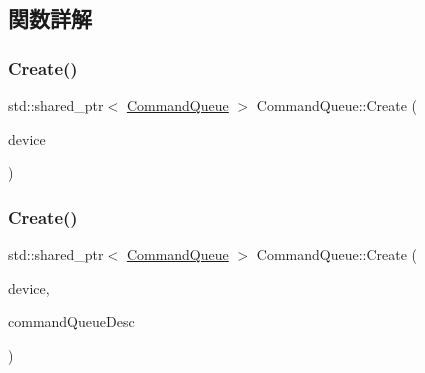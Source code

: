 \subsection{関数詳解}
\mbox{\label{class_command_queue_ad8d289f42aa38adfb872d956e678363b}} 
\subsubsection{\texorpdfstring{Create()}{Create()}\hspace{0.1cm}{\footnotesize\ttfamily [1/2]}}
{\footnotesize\ttfamily std\+::shared\+\_\+ptr$<$ \mbox{\hyperlink{class_command_queue}{Command\+Queue}} $>$ Command\+Queue\+::\+Create (\begin{DoxyParamCaption}\item[{std\+::shared\+\_\+ptr$<$ \mbox{\hyperlink{class_device}{Device}} $>$}]{device }\end{DoxyParamCaption})\hspace{0.3cm}{\ttfamily [static]}}

\mbox{\label{class_command_queue_a0498f9a8f823972c11de356a5cdd09cf}} 
\subsubsection{\texorpdfstring{Create()}{Create()}\hspace{0.1cm}{\footnotesize\ttfamily [2/2]}}
{\footnotesize\ttfamily std\+::shared\+\_\+ptr$<$ \mbox{\hyperlink{class_command_queue}{Command\+Queue}} $>$ Command\+Queue\+::\+Create (\begin{DoxyParamCaption}\item[{std\+::shared\+\_\+ptr$<$ \mbox{\hyperlink{class_device}{Device}} $>$}]{device,  }\item[{const D3\+D12\+\_\+\+C\+O\+M\+M\+A\+N\+D\+\_\+\+Q\+U\+E\+U\+E\+\_\+\+D\+E\+SC \&}]{command\+Queue\+Desc }\end{DoxyParamCaption})\hspace{0.3cm}{\ttfamily [static]}}

\mbox{\label{class_command_queue_ad6fd0cec1c28bd609a98a9f4255c57d7}} 
